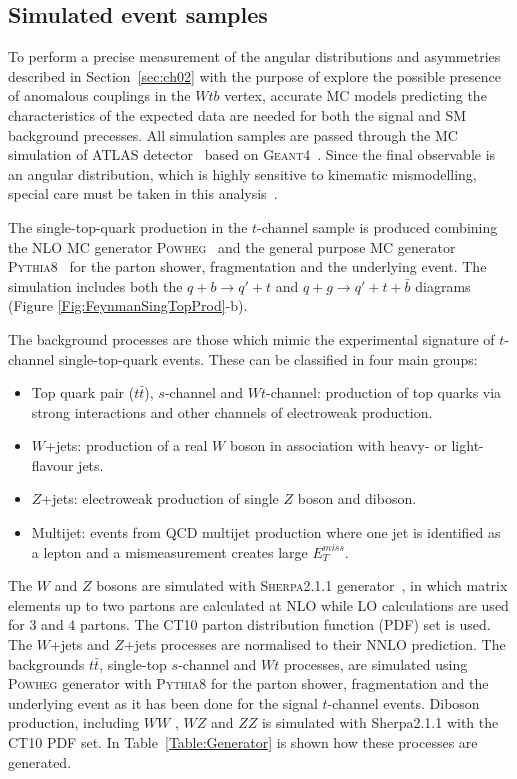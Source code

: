 \subsection{Simulated event samples}

To perform a precise measurement of the angular distributions and asymmetries described in Section~\ref{sec:ch02} with the purpose of explore the possible presence of anomalous couplings in the $Wtb$ vertex, accurate MC models predicting the characteristics of the expected data are needed for both the signal and SM background precesses. All simulation samples are passed through the MC simulation of ATLAS detector~\cite{Aad:2010ah} based on \textsc{Geant4}~\cite{Agostinelli:2002hh}. Since the final observable is an angular distribution, which is highly sensitive to kinematic mismodelling, special care must be taken in this analysis~\cite{MorenoLlacer:2014tca}.


The single-top-quark production in the $t$-channel sample is produced combining the NLO MC generator \textsc{Powheg}~\cite{Alioli2010} and the general purpose MC generator \textsc{Pythia8}~\cite{Sjostrand:2006za} for the parton shower, fragmentation and the underlying event. The simulation includes both the $q+b \rightarrow q'+t$ and $q+g \rightarrow q' +t +\bar{b}$ diagrams (Figure \ref{Fig:FeynmanSingTopProd}-b).



The background processes are those which mimic the experimental signature of $t$-channel single-top-quark events. These can be classified in four main groups:
\begin{itemize}
\item Top quark pair ($t\bar{t}$), $s$-channel and $Wt$-channel: production of top quarks via strong interactions and other channels of electroweak production.
\item $W$+jets: production of a real $W$ boson in association with heavy- or light-flavour jets.
\item $Z$+jets: electroweak production of single $Z$ boson and diboson.
\item Multijet: events from QCD multijet production where one jet is identified as a lepton and a mismeasurement creates large $E_T^{miss}$. %
\end{itemize}

The $W$ and $Z$ bosons are simulated with \textsc{Sherpa}2.1.1 generator~\cite{5-ref24}, in which matrix elements up to two partons are calculated at NLO while LO calculations are used for 3 and 4 partons. The CT10 parton distribution function (PDF) set is used. The $W$+jets and $Z$+jets processes are normalised to their NNLO prediction. The backgrounds $t\bar{t}$, single-top $s$-channel and $Wt$ processes, are simulated using \textsc{Powheg} generator with \textsc{Pythia8} for the parton shower, fragmentation and the underlying event as it has been done for the signal $t$-channel events. Diboson production, including $WW$ , $WZ$ and $ZZ$ is simulated with Sherpa2.1.1 with the CT10 PDF set. In Table~\ref{Table:Generator} is shown how these processes are generated.

